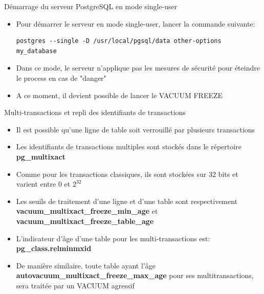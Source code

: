 
\begin{frame}[fragile]{Démarrage du serveur PostgreSQL en mode single-user}

\begin{itemize}
   \item Pour démarrer le serveur en mode single-user, lancer la commande suivante:
\begin{tiny}
\begin{Verbatim}[commandchars=\\\{\}]
   postgres --single -D /usr/local/pgsql/data other-options my_database
\end{Verbatim}
\end{tiny}
   \item Dans ce mode, le serveur n'applique pas les mesures de sécurité pour éteindre le process en cas de "danger"
   \item A ce moment, il devient possible de lancer le VACUUM FREEZE
\end{itemize}

\begin{toile}
\end{toile}

\end{frame}


\begin{frame}{Multi-transactions et repli des identifiants de transactions}

\begin{itemize}
   \item Il est possible qu'une ligne de table soit verrouillé par plusieurs transactions
   \item Les identifiants de transactions multiples sont stockés dans le répertoire \textbf{pg\_multixact}
   \item Comme pour les transactions classiques, ils sont stockées sur 32 bits et varient entre 0 et $2^{32}$
   \item Les seuils de traitement d'une ligne et d'une table sont respectivement \textbf{vacuum\_multixact\_freeze\_min\_age} et \textbf{vacuum\_multixact\_freeze\_table\_age}
   \item L'indicateur d'âge d'une table pour les multi-transactions est: \textbf{pg\_class.relminmxid}
   \item De manière similaire,  toute table ayant l'âge \textbf{autovacuum\_multixact\_freeze\_max\_age} pour ses multitransactions, sera traitée par un VACUUM agressif

\end{itemize}

\end{frame}


